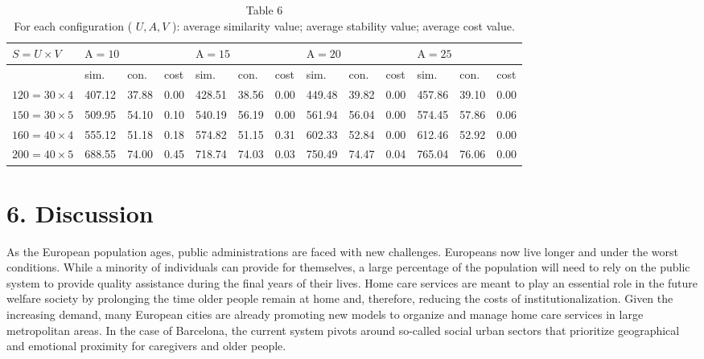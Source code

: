 \documentclass[10pt]{article}
\begin{document}
\begin{table}[h]
\begin{center}
\captionsetup{labelformat=empty}
\caption{Table 6\\
For each configuration ( $U, A, V$ ): average similarity value; average stability value; average cost value.}
\begin{tabular}{|l|l|l|l|l|l|l|l|l|l|l|l|l|}
\hline
\multirow[t]{2}{*}{$S=U \times V$} & \multicolumn{3}{|l|}{$\mathrm{A}=10$} & \multicolumn{3}{|l|}{$\mathrm{A}=15$} & \multicolumn{3}{|l|}{$\mathrm{A}=20$} & \multicolumn{3}{|l|}{$\mathrm{A}=25$} \\
\hline
 & sim. & con. & cost & sim. & con. & cost & sim. & con. & cost & sim. & con. & cost \\
\hline
$120=30 \times 4$ & 407.12 & 37.88 & 0.00 & 428.51 & 38.56 & 0.00 & 449.48 & 39.82 & 0.00 & 457.86 & 39.10 & 0.00 \\
\hline
$150=30 \times 5$ & 509.95 & 54.10 & 0.10 & 540.19 & 56.19 & 0.00 & 561.94 & 56.04 & 0.00 & 574.45 & 57.86 & 0.06 \\
\hline
$160=40 \times 4$ & 555.12 & 51.18 & 0.18 & 574.82 & 51.15 & 0.31 & 602.33 & 52.84 & 0.00 & 612.46 & 52.92 & 0.00 \\
\hline
$200=40 \times 5$ & 688.55 & 74.00 & 0.45 & 718.74 & 74.03 & 0.03 & 750.49 & 74.47 & 0.04 & 765.04 & 76.06 & 0.00 \\
\hline
\end{tabular}
\end{center}
\end{table}

\section*{6. Discussion}
As the European population ages, public administrations are faced with new challenges. Europeans now live longer and under the worst conditions. While a minority of individuals can provide for themselves, a large percentage of the population will need to rely on the public system to provide quality assistance during the final years of their lives. Home care services are meant to play an essential role in the future welfare society by prolonging the time older people remain at home and, therefore, reducing the costs of institutionalization. Given the increasing demand, many European cities are already promoting new models to organize and manage home care services in large metropolitan areas. In the case of Barcelona, the current system pivots around so-called social urban sectors that prioritize geographical and emotional proximity for caregivers and older people.
\end{document}
